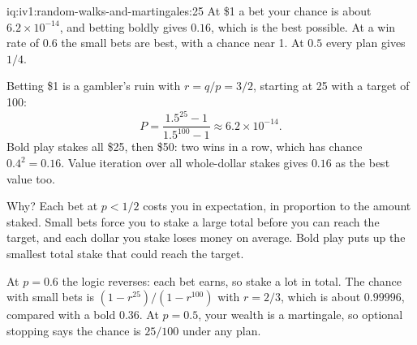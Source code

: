 \begin{solution}{iq:iv1:random-walks-and-martingales:25}
At \$1 a bet your chance is about $6.2 \times 10^{-14}$, and betting boldly gives $0.16$, which is the best possible. At a win rate of $0.6$ the small bets are best, with a chance near 1. At $0.5$ every plan gives $1/4$.

Betting \$1 is a gambler's ruin with $r = q/p = 3/2$, starting at 25 with a target of 100:
\[
P = \frac{1.5^{25} - 1}{1.5^{100} - 1} \approx 6.2 \times 10^{-14}.
\]
Bold play stakes all \$25, then \$50: two wins in a row, which has chance $0.4^2 = 0.16$. Value iteration over all whole-dollar stakes gives $0.16$ as the best value too.

Why? Each bet at $p < 1/2$ costs you in expectation, in proportion to the amount staked. Small bets force you to stake a large total before you can reach the target, and each dollar you stake loses money on average. Bold play puts up the smallest total stake that could reach the target.

At $p = 0.6$ the logic reverses: each bet earns, so stake a lot in total. The chance with small bets is $(1 - r^{25})/(1 - r^{100})$ with $r = 2/3$, which is about $0.99996$, compared with a bold $0.36$. At $p = 0.5$, your wealth is a martingale, so optional stopping says the chance is $25/100$ under any plan.

\end{solution}
